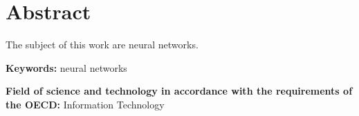 \section*{Abstract}
  \tab The subject of this work are neural networks.

  \bigskip

  \noindent\textbf{Keywords:} neural networks

  \bigskip

  \noindent\textbf{Field of science and technology in accordance with the
  requirements of the OECD:} Information Technology
